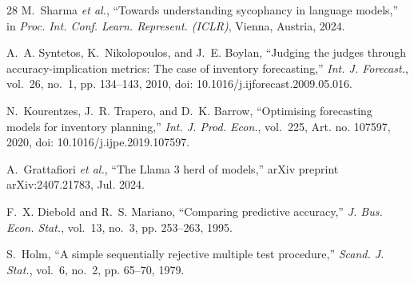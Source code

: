 \documentclass[conference]{IEEEtran}
\begin{document}
\begin{thebibliography}{28}
M.~Sharma \emph{et al.}, ``Towards understanding sycophancy in language models,'' in \emph{Proc.
Int. Conf. Learn. Represent. (ICLR)}, Vienna, Austria, 2024.

A.~A. Syntetos, K.~Nikolopoulos, and J.~E. Boylan, ``Judging the judges through
accuracy-implication metrics: The case of inventory forecasting,'' \emph{Int. J. Forecast.},
vol.~26, no.~1, pp. 134--143, 2010, doi: 10.1016/j.ijforecast.2009.05.016.

N.~Kourentzes, J.~R. Trapero, and D.~K. Barrow, ``Optimising forecasting models for inventory
planning,'' \emph{Int. J. Prod. Econ.}, vol.~225, Art. no. 107597, 2020,
doi: 10.1016/j.ijpe.2019.107597.

A.~Grattafiori \emph{et al.}, ``The Llama 3 herd of models,'' arXiv preprint arXiv:2407.21783,
Jul. 2024.

F.~X. Diebold and R.~S. Mariano, ``Comparing predictive accuracy,'' \emph{J. Bus. Econ. Stat.},
vol.~13, no.~3, pp. 253--263, 1995.

S.~Holm, ``A simple sequentially rejective multiple test procedure,'' \emph{Scand. J. Stat.},
vol.~6, no.~2, pp. 65--70, 1979.

\end{thebibliography}
\end{document}
